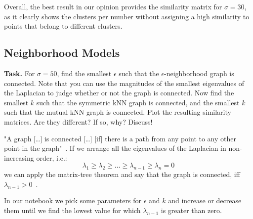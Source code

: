 \documentclass{support/acm_proc_article-sp}
\begin{document}
    Overall, the best result in our opinion provides the similarity matrix for $\sigma = 30$, as it clearly shows the clusters
    per number without assigning a high similarity to points that belong to different clusters.


    \subsection{Neighborhood Models}
    \label{subsec:neighborhood-models}

    \textbf{Task.} For $\sigma = 50$, find the smallest $\epsilon$ such that the $\epsilon$-neighborhood graph is
    connected.
    Note that you can use the magnitudes of the smallest eigenvalues of the Laplacian to judge whether or not the graph
    is connected.
    Now find the smallest $k$ such that the symmetric kNN graph is connected, and the smallest $k$ such that the mutual
    kNN graph is connected.
    Plot the resulting similarity matrices.
    Are they different?
    If so, why?
    Discuss!

    "A graph [\ldots] is connected [\ldots] [if] there is a path from any point to any other point in
    the graph"~\cite{Weissstein2018}.
    If we arrange all the eigenvalues of the Laplacian in non-increasing order, i.e.\@:
    \begin{equation*}
        \lambda_1 \geq \lambda_2 \geq \ldots \geq \lambda_{n-1} \geq \lambda_n = 0
    \end{equation*}
    we can apply the matrix-tree theorem and say that the graph is connected, iff
    $\lambda_{n-1} > 0$~\cite[cf.p.3]{Zhang2011}.

    In our notebook we pick some parameters for $\epsilon$ and $k$ and increase or decrease them until we find the lowest
    value for which $\lambda_{n-1}$ is greater than zero.
\end{document}
